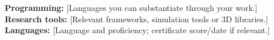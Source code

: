 \textbf{Programming:} [Languages you can substantiate through your work.]\\
\textbf{Research tools:} [Relevant frameworks, simulation tools or 3D libraries.]\\
\textbf{Languages:} [Language and proficiency; certificate score/date if relevant.]